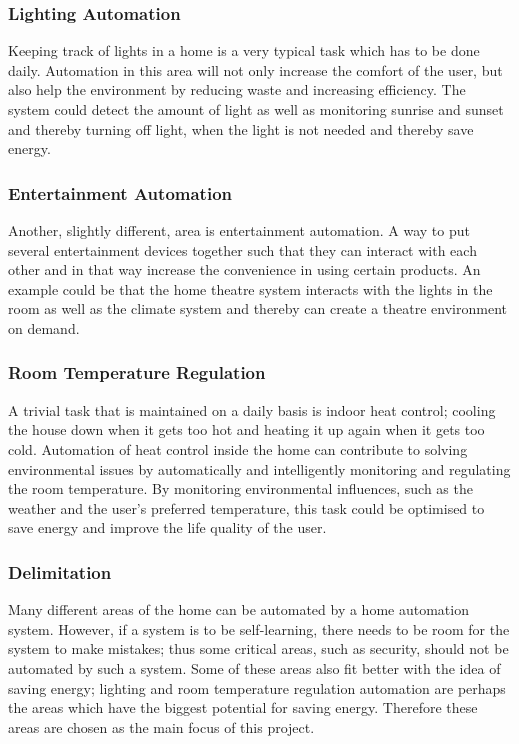 \subsubsection{Lighting Automation}
\label{sub:Lighting Automation}
Keeping track of lights in a home is a very typical task which has to be done daily. Automation in this area will not only increase the comfort of the user, but also help the environment by reducing waste and increasing efficiency. The system could detect the amount of light as well as monitoring sunrise and sunset and thereby turning off light, when the light is not needed and thereby save energy.

\subsubsection{Entertainment Automation} 
\label{sub:Entertainment Automation}
Another, slightly different, area is entertainment automation. A way to put several entertainment devices together such that they can interact with each other and in that way increase the convenience in using certain products. An example could be that the home theatre system interacts with the lights in the room as well as the climate system and thereby can create a theatre environment on demand.

\subsubsection{Room Temperature Regulation}
\label{sub:Room Temperature Regulation}
A trivial task that is maintained on a daily basis is indoor heat control; cooling the house down when it gets too hot and heating it up again when it gets too cold. Automation of heat control inside the home can contribute to solving environmental issues by automatically and intelligently monitoring and regulating the room temperature. By monitoring environmental influences, such as the weather and the user's preferred temperature, this task could be optimised to save energy and improve the life quality of the user.

\subsubsection{Delimitation}
Many different areas of the home can be automated by a home automation system. However, if a system is to be self-learning, there needs to be room for the system to make mistakes; thus some critical areas, such as security, should not be automated by such a system. Some of these areas also fit better with the idea of saving energy; lighting and room temperature regulation automation are perhaps the areas which have the biggest potential for saving energy. Therefore these areas are chosen as the main focus of this project.
